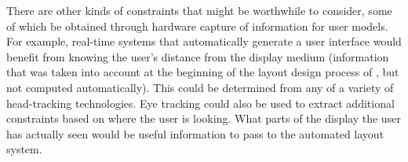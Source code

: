     There are other kinds of constraints that might be worthwhile to consider,
    some of which be obtained through hardware capture of information for user
    models. For example, real-time systems that automatically generate a user
    interface would benefit from knowing the user’s distance from the display
    medium (information that was taken into account at the beginning of the
    layout design process of \citep{feiner-1}, but not computed automatically).
    This could be determined from any of a variety of head-tracking
    technologies. Eye tracking could also be used to extract additional
    constraints based on where the user is looking. What parts of the display
    the user has actually seen would be useful information to pass to the
    automated layout system.

